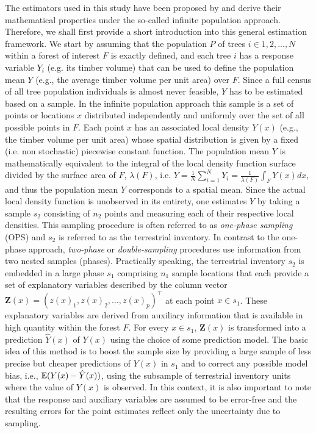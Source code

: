 The estimators used in this study have been proposed by \citep{mandallaz2013a,mandallaz2013b} and derive their mathematical properties under the so-called infinite population approach. Therefore, we shall first provide a short introduction into this general estimation framework. We start by assuming that the population $P$ of trees $i \in 1,2, ..., N$ within a forest of interest $F$ is exactly defined, and each tree $i$ has a response variable $Y_i$ (e.g. its timber volume) that can be used to define the population mean $Y$ (e.g., the average timber volume per unit area) over $F$. Since a full census of all tree population individuals is almost never feasible, $Y$ has to be estimated based on a sample. In the infinite population approach this sample is a set of points or locations $x$ distributed independently and uniformly over the set of all possible points in $F$. Each point $x$ has an associated local density $Y(x)$ (e.g., the timber volume per unit area) whose spatial distribution is given by a fixed (i.e. non stochastic) piecewise constant function. The population mean $Y$ is mathematically equivalent to the integral of the local density function surface divided by the surface area of $F$, $\lambda(F)$, i.e. $Y=\frac{1}{N} \sum_{i=1}^{N}Y_i=\frac{1}{\lambda(F)}\int_{F}Y(x)dx$, and thus the population mean $Y$ corresponds to a spatial mean. Since the actual local density function is unobserved in its entirety, one estimates $Y$ by taking a sample $s_2$ consisting of $n_2$ points and measuring each of their respective local densities. This sampling procedure is often referred to as \textit{one-phase sampling} (OPS) and $s_2$ is referred to as the terrestrial inventory. In contrast to the one-phase approach, \textit{two-phase} or \textit{double-sampling} procedures use information from two nested samples (phases). Practically speaking, the terrestrial inventory $s_2$ is embedded in a large phase $s_1$ comprising $n_1$ sample locations that each provide a set of explanatory variables described by the column vector $\pmb{Z}(x)=(z(x)_1, z(x)_2,...,z(x)_p)^{\top}$ at each point $x \in s_1$. These explanatory variables are derived from auxiliary information that is available in high quantity within the forest $F$. For every $x \in s_1$, $\pmb{Z}(x)$ is transformed into a prediction $\hat{Y}(x)$ of $Y(x)$ using the choice of some prediction model. The basic idea of this method is to boost the sample size by providing a large sample of less precise but cheaper predictions of $Y(x)$ in $s_1$ and to correct any possible model bias, i.e., $\mathbb{E}{(Y(x)-\hat{Y}(x))}$, using the subsample of terrestrial inventory units where the value of $Y(x)$ is observed. In this context, it is also important to note that the response and auxiliary variables are assumed to be error-free and the resulting errors for the point estimates reflect only the uncertainty due to sampling.

